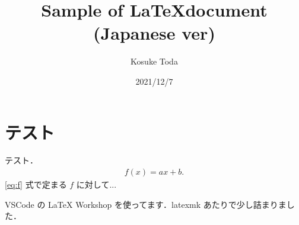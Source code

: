 \documentclass[dvipdfmx]{jsarticle}
\begin{document}
    \title{Sample of \LaTeX document (Japanese ver)}
    \author{Kosuke Toda}
    \date{2021/12/7}
    \maketitle

    \section{テスト}
    テスト．
    \begin{align}
        f(x) = ax + b. \label{eq:f}
    \end{align}
    \eqref{eq:f} 式で定まる $f$ に対して...

    VSCode の LaTeX Workshop を使ってます．latexmk あたりで少し詰まりました．
\end{document}
